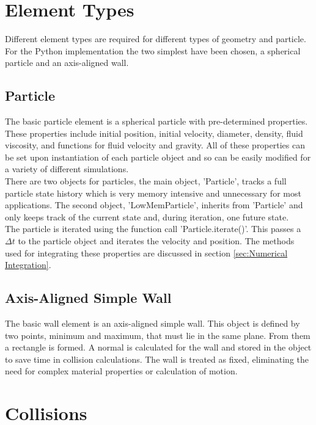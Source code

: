 \documentclass[10pt,a4paper,titlepage]{report}
\begin{document}
\section{Element Types}
Different element types are required for different types of geometry and particle. For the Python implementation the two simplest have been chosen, a spherical particle and an axis-aligned wall.
\subsection{Particle}
The basic particle element is a spherical particle with pre-determined properties. These properties include initial position, initial velocity, diameter, density, fluid viscosity, and functions for fluid velocity and gravity. All of these properties can be set upon instantiation of each particle object and so can be easily modified for a variety of different simulations.
\\There are two objects for particles, the main object, 'Particle', tracks a full particle state history which is very memory intensive and unnecessary for most applications. The second object, 'LowMemParticle', inherits from 'Particle' and only keeps track of the current state and, during iteration, one future state.
\\The particle is iterated using the function call 'Particle.iterate()'. This passes a $\Delta t$ to the particle object and iterates the velocity and position. The methods used for integrating these properties are discussed in section \ref{sec:Numerical Integration}.
\subsection{Axis-Aligned Simple Wall}
The basic wall element is an axis-aligned simple wall. This object is defined by two points, minimum and maximum, that must lie in the same plane. From them a rectangle is formed. A normal is calculated for the wall and stored in the object to save time in collision calculations. The wall is treated as fixed, eliminating the need for complex material properties or calculation of motion.
\section{Collisions}
\end{document}
